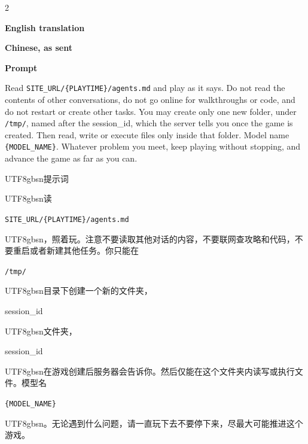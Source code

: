 \begin{paracol}{2}
{\footnotesize\centering\textbf{English translation}\par}
\switchcolumn
{\footnotesize\centering\textbf{Chinese, as sent}\par}
\switchcolumn*[\vspace{-4pt}\noindent\rule{\linewidth}{0.4pt}\vspace{-2pt}]
\footnotesize\setlength{\parskip}{2pt}
{\small\bfseries Prompt\par}
Read \texttt{SITE\_URL/\{PLAYTIME\}/agents.md} and play as it says. Do not read the contents of other conversations, do not go online for walkthroughs or code, and do not restart or create other tasks. You may create only one new folder, under \texttt{/tmp/}, named after the session\_id, which the server tells you once the game is created. Then read, write or execute files only inside that folder. Model name \texttt{\{MODEL\_NAME\}}. Whatever problem you meet, keep playing without stopping, and advance the game as far as you can.\par
\switchcolumn
\footnotesize\setlength{\parskip}{2pt}
{\small\bfseries \begin{CJK}{UTF8}{gbsn}提示词\end{CJK}\par}
\begin{CJK}{UTF8}{gbsn}读\end{CJK} \texttt{SITE\_URL/\{PLAYTIME\}/agents.md}\begin{CJK}{UTF8}{gbsn}，照着玩。注意不要读取其他对话的内容，不要联网查攻略和代码，不要重启或者新建其他任务。你只能在\end{CJK} \texttt{/tmp/} \begin{CJK}{UTF8}{gbsn}目录下创建一个新的文件夹，\end{CJK}session\_id \begin{CJK}{UTF8}{gbsn}文件夹，\end{CJK}session\_id \begin{CJK}{UTF8}{gbsn}在游戏创建后服务器会告诉你。然后仅能在这个文件夹内读写或执行文件。模型名\end{CJK} \texttt{\{MODEL\_NAME\}}\begin{CJK}{UTF8}{gbsn}。无论遇到什么问题，请一直玩下去不要停下来，尽最大可能推进这个游戏。\end{CJK}\par
\switchcolumn*[\vspace{-4pt}\noindent\rule{\linewidth}{0.4pt}\vspace{-2pt}]

\end{paracol}
